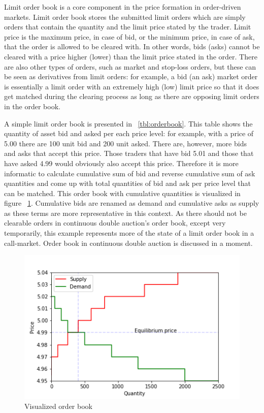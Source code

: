 Limit order book is a core component in the price formation in order-driven markets.
Limit order book stores the submitted limit orders which are simply orders that contain the quantity and 
the limit price stated by the trader. Limit price is the maximum price, in case of bid, or the minimum
price, in case of ask, that the order is allowed to be cleared with. In other words,
bids (asks) cannot be cleared with a price higher (lower) than the limit price stated 
in the order. There are also other types of orders, such as market and 
stop-loss orders, but these can be seen as derivatives from limit orders: 
for example, a bid (an ask) market order is essentially a limit order 
with an extremely high (low) limit price so that it does get matched 
during the clearing process as long as there are opposing limit orders in the 
order book. \citep{lob13} %



A simple limit order book is presented in ~\ref{tbl:orderbook}. This table shows the
quantity of asset bid and asked per each price level: for example, with a price of 5.00
there are 100 unit bid and 200 unit asked. There are, however, more bids and asks that 
accept this price. Those traders that have bid 5.01 and those that have asked 4.99 would obviously also accept
this price. Therefore it is more informatic to calculate cumulative sum of bid and reverse cumulative sum of 
ask quantities and come up with total quantities of bid and ask per price level that can be matched.  
This order book with cumulative quantities is visualized in figure ~\ref{fig:lob_visual}. Cumulative bids
are renamed as demand and cumulative asks as supply as these terms are more representative in this context.
As there should not be clearable orders in continuous double auction's order book, except very temporarily, 
this example represents more of the state of a limit order book in a call-market. Order book
in continuous double auction is discussed in a moment.

\begin{figure}
    \begin{center}  
        \includegraphics{plots/orderbook_visualized.png}
        \caption{Visualized order book}
        \label{fig:lob_visual}
    \end{center}
\end{figure}


